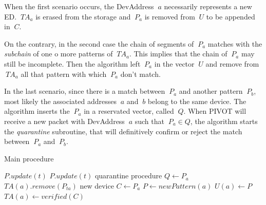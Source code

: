 When the first scenario occurs, the DevAddress \(\ a \) necessarily represents a new ED. \(\ TA_{a} \) is erased from the storage and \(\ P_{a} \) is removed from \(\ U \) to be appended in \(\ C \). 

\vspace{5mm}

On the contrary, in the second case the chain of segments of \(\ P_{a} \) matches with the \textit{subchain} of one o more patterns of \(\ TA_{a} \). This implies that the chain of \(\ P_{a} \) may still be incomplete. Then the algorithm left \(\ P_{a} \) in the vector \(\ U \) and remove from \(\ TA_{a} \) all that pattern with which \(\ P_{a} \) don't match. 

\vspace{5mm}

In the last scenario, since there is a match between \(\ P_{a} \) and another pattern \(\ P_{b} \), most likely the associated addresses \(\ a \) and \(\ b \) belong to the same device. The algorithm inserts the \(\ P_{a} \) in a reservated vector, called \(\ Q \). When PIVOT will receive a new packet with DevAddress \(\ a \) such that \(\ P_{a} \in Q \), the algorithm starts the \textit{quarantine} subroutine, that will definitively confirm or reject the match between \(\ P_{a} \) and \(\ P_{b} \).

\vspace{3mm}
\begin{algorithm}
    \caption{Main procedure}
    \begin{algorithmic}[1]
            \State $P.update(t)$
        \Else
                \State $P.update(t)$
                    \State quarantine procedure
                \EndIf
                        \State $Q \gets P_{a}$
                    \Else
                        \State $TA(a).remove(P_{ta})$
                    \EndIf
                \EndFor
                    \State new device
                    \State $C \gets P_{a}$
                \EndIf
            \Else
                \State $P \gets newPattern(a)$
                \State $U(a) \gets P$
                \State $TA(a) \gets verified(C)$
            \EndIf
        \EndIf
    \end{algorithmic}
\end{algorithm}

\newpage

